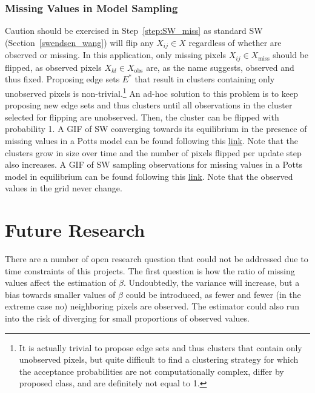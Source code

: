 \documentclass[12pt, twoside]{article}
\newcommand{\1}{\mathbb{1}}
\begin{document}
\subsubsection{Missing Values in Model Sampling}\label{missing_values_model_sampling}
Caution should be exercised in Step~\ref{step:SW_miss} as standard SW (Section~\ref{swendsen_wang}) will flip any $X_{ij} \in X$ regardless of whether are observed or missing. In this application, only missing pixels $X_{ij} \in X_\text{miss}$ should be flipped, as observed pixels $X_{kl} \in X_\text{obs}$ are, as the name suggests, observed and thus fixed. 
Proposing edge sets $E^*$ that result in clusters containing only unobserved pixels is non-trivial.\footnote{It is actually trivial to propose edge sets and thus clusters that contain only unobserved pixels, but quite difficult to find a clustering strategy for which the acceptance probabilities are not computationally complex, differ by proposed class, and are definitely not equal to 1.} 
An ad-hoc solution to this problem is to keep proposing new edge sets and thus clusters until all observations in the cluster selected for flipping are unobserved. Then, the cluster can be flipped with probability 1.
%
A GIF of SW converging towards its equilibrium in the presence of missing values in a Potts model can be found following this \href{https://github.com/maierhofert/2DPottsModel/blob/master/plots/grid_missing_burnin.gif}{\underline{link}}. Note that the clusters grow in size over time and the number of pixels flipped per update step also increases.
%
A GIF of SW sampling observations for missing values in a Potts model in equilibrium can be found following this \href{https://github.com/maierhofert/2DPottsModel/blob/master/plots/grid_missing_equilibrium.gif}{\underline{link}}.
Note that the observed values in the grid never change.

\clearpage
\section{Future Research}\label{future_research}
There are a number of open research question that could not be addressed due to time constraints of this projects. 
The first question is how the ratio of missing values affect the estimation of $\beta$. Undoubtedly, the variance will increase, but a bias towards smaller values of $\beta$ could be introduced, as fewer and fewer (in the extreme case no) neighboring pixels are observed. The estimator could also run into the risk of diverging for small proportions of observed values.
\end{document}
